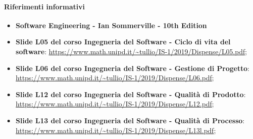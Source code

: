 \paragraph{Riferimenti informativi}
\begin{itemize}
	\item \textbf{Software Engineering - Ian Sommerville - 10th Edition}
	\item \textbf{Slide L05 del corso Ingegneria del Software - Ciclo di vita del software}: 
	\url{https://www.math.unipd.it/~tullio/IS-1/2019/Dispense/L05.pdf};
	\item \textbf{Slide L06 del corso Ingegneria del Software - Gestione di Progetto}: 
	\url{https://www.math.unipd.it/~tullio/IS-1/2019/Dispense/L06.pdf};	
	\item \textbf{Slide L12 del corso Ingegneria del Software - Qualità di Prodotto}: 
	\url{https://www.math.unipd.it/~tullio/IS-1/2019/Dispense/L12.pdf};
	\item \textbf{Slide L13 del corso Ingegneria del Software - Qualità di Processo}: 
	\url{https://www.math.unipd.it/~tullio/IS-1/2019/Dispense/L13l.pdf};
\end{itemize}